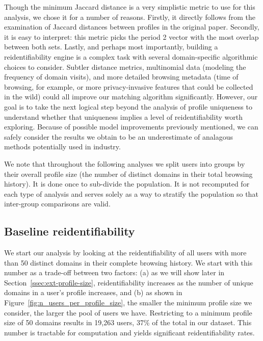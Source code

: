 \documentclass[letterpaper,twocolumn,10pt]{article}
\begin{document}
Though the minimum Jaccard distance is a very simplistic metric to use for this analysis, we chose it for a number of reasons. 
Firstly, it directly follows from the examination of Jaccard distances between profiles in the original paper. 
Secondly, it is easy to interpret: this metric picks the period 2 vector with the most overlap between both sets.
Lastly, and perhaps most importantly, building a reidentifiability engine is a complex task with several domain-specific algorithmic choices to consider. 
Subtler distance metrics, multinomial data (modeling the frequency of domain visits), and more detailed browsing metadata (time of browsing, for example, or more privacy-invasive features that could be collected in the wild) could all improve our matching algorithm significantly.
However, our goal is to take the next logical step beyond the analysis of profile uniqueness to understand whether that uniqueness implies a level of reidentifiability worth exploring. 
Because of possible model improvements previously mentioned, we can safely consider the results we obtain to be an underestimate of analagous methods potentially used in industry. 

We note that throughout the following analyses we split users into groups by their overall profile size (the number of distinct domains in their total browsing history). It is done once to sub-divide the population. It is not recomputed for each type of analysis and serves solely as a way to stratify the population so that inter-group comparisons are valid.
%
\subsection{Baseline reidentifiability}
\label{ssec:ext-basic-rejoinability}
%
We start our analysis by looking at the reidentifiability of all users with more than 50 distinct domains in their complete browsing history.
We start with this number as a trade-off between two factors: (a) as we will show later in Section~\ref{ssec:ext-profile-size}, reidentifiability increases as the number of unique domains in a user's profile increases, and (b) as shown in Figure~\ref{fig:n_users_per_profile_size}, the smaller the minimum profile size we consider, the larger the pool of users we have. 
Restricting to a minimum profile size of 50 domains results in 19,263 users, 37\% of the total in our dataset. This number is tractable for computation and yields significant reidentifiability rates.
\end{document}
